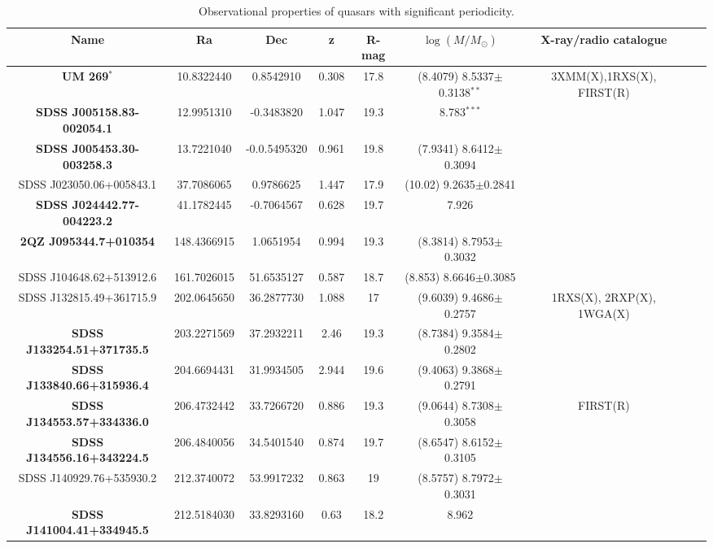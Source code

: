 

\clearpage
\begin{table}
\caption{Observational properties of quasars with significant periodicity.}
\centering
\begin{tabular}{|c| c| c| c| c| c| c| c| c|}
\hline
Name											&Ra						&Dec					&z		&R-mag	&$\log\left(M/M_{\odot}\right)$ &X-ray/radio catalogue\\
\hline\hline
\textbf{UM 269}$^{*}$ 									&10.8322440			&0.8542910			&0.308			&17.8		&(8.4079) 8.5337$\pm$0.3138$^{**}$	&3XMM(X),1RXS(X), FIRST(R) \\
\textbf{SDSS J005158.83-002054.1} 		&12.9951310		&-0.3483820		&1.047			&19.3		&8.783$^{***}$		&\\
\textbf{SDSS J005453.30-003258.3}		&13.7221040		&-0.0.5495320	&0.961			&19.8		&(7.9341)	8.6412$\pm$0.3094&\\
SDSS J023050.06+005843.1 		&37.7086065 		&0.9786625			&1.447			&17.9		&(10.02) 9.2635$\pm$0.2841&\\
\textbf{SDSS J024442.77-004223.2} 		&41.1782445		&-0.7064567		&0.628			&19.7		&7.926		&\\
\textbf{2QZ J095344.7+010354}     		&148.4366915		&1.0651954			&0.994			&19.3		&(8.3814) 8.7953$\pm$0.3032	&\\
SDSS J104648.62+513912.6 		&161.7026015		&51.6535127		&0.587			&18.7		&(8.853) 8.6646$\pm$0.3085&\\
SDSS J132815.49+361715.9 		&202.0645650		&36.2877730		&1.088			&17			&(9.6039) 9.4686$\pm$0.2757&1RXS(X), 2RXP(X), 1WGA(X)\\
\textbf{SDSS J133254.51+371735.5} 		&203.2271569		&37.2932211		&2.46			&19.3		&(8.7384) 9.3584$\pm$0.2802&\\
\textbf{SDSS J133840.66+315936.4} 		&204.6694431		&31.9934505		&2.944			&19.6		&(9.4063) 9.3868$\pm$0.2791&\\
\textbf{SDSS J134553.57+334336.0} 		&206.4732442		&33.7266720		&0.886			&19.3		&(9.0644)	 8.7308$\pm$0.3058& FIRST(R)\\
\textbf{SDSS J134556.16+343224.5} 		&206.4840056		&34.5401540		&0.874			&19.7		&(8.6547) 8.6152$\pm$0.3105&\\
SDSS J140929.76+535930.2 		&212.3740072		&53.9917232		&0.863			&19			&(8.5757)	 8.7972$\pm$0.3031&\\
\textbf{SDSS J141004.41+334945.5} 		&212.5184030		&33.8293160		&0.63			&18.2		&8.962		&\\

\end{tabular}
\end{table}
